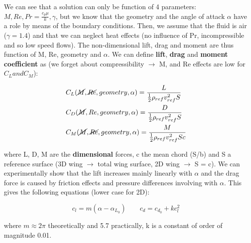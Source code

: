 			We can see that a solution can only be function of 4 parameters: $M, Re, Pr = \frac{c_p \mu}{k}, \gamma$, but we know that the geometry and the angle of attack $\alpha$ have a role by means of the boundary conditions. Then, we assume that the fluid is air ($\gamma =1.4$) and that we can neglect heat effects (no influence of Pr, incompressible and so low speed flows). The non-dimensional lift, drag and moment are thus function of M, Re, geometry and $\alpha$. We can define \textbf{lift}, \textbf{drag} and \textbf{moment coefficient} as (we forget about compressibility $\rightarrow$ M, and Re effects are low for $C_L and C_M$): 
			
			\begin{equation}
			\begin{aligned}
			&C_L(\cancel{M}, \cancel{Re}, geometry, \alpha) = \frac{L}{\frac{1}{2}\rho _{ref} v^2_{ref} S} \\
			&C_D(\cancel{M},Re, geometry, \alpha) = \frac{D}{\frac{1}{2}\rho _{ref} v^2_{ref} S}		\\
			&C_M(\cancel{M}, \cancel{Re}, geometry, \alpha) = \frac{M}{\frac{1}{2}\rho _{ref} v^2_{ref} Sc}
			\end{aligned}	
			\label{eq:2.18}		
			\end{equation}
			
			where L, D, M are the \textbf{dimensional} forces, c the mean chord (S/b) and S a reference surface (3D wing $\rightarrow$ total wing surface, 2D wing $\rightarrow$ S = c). We can experimentally show that the lift increases mainly linearly with $\alpha$ and the drag force is caused by friction effects and pressure differences involving with $\alpha$. This gives the following equations (lower case for 2D):
			
			\begin{equation}
			c_l = m(\alpha - \alpha _{L_0}) \qquad c_d = c_{d_0} + kc^2_l
			\end{equation}
			
			where $m\approx 2\pi$ theoretically and 5.7 practically, k is a constant of order of magnitude 0.01. 
			

